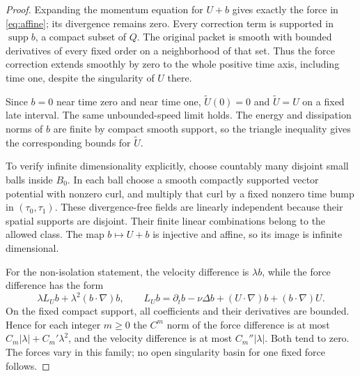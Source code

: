 \documentclass[11pt,a4paper]{article}
\theoremstyle{definition}\newtheorem{definition}[theorem]{Definition}
\theoremstyle{remark}\newtheorem{remark}[theorem]{Remark}
\DeclareMathOperator{\supp}{supp}
\begin{document}
\begin{proof}
Expanding the momentum equation for $U+b$ gives exactly the force in
\eqref{eq:affine}; its divergence remains zero. Every correction term is supported in $\supp b$, a compact subset of $Q$. The original packet is smooth with bounded derivatives of every fixed order on a neighborhood of that set. Thus the force correction extends smoothly by zero to the whole positive time axis, including time one, despite the singularity of $U$ there.

Since $b=0$ near time zero and near time one,
$\widetilde U(0)=0$ and $\widetilde U=U$ on a fixed late interval.
The same unbounded-speed limit holds. The energy and dissipation norms of $b$ are finite by compact smooth support, so the triangle inequality gives the corresponding bounds for $\widetilde U$.

To verify infinite dimensionality explicitly, choose countably many disjoint small balls inside $B_0$. In each ball choose a smooth compactly supported vector potential with nonzero curl, and multiply that curl by a fixed nonzero time bump in $(\tau_0,\tau_1)$. These divergence-free fields are linearly independent because their spatial supports are disjoint. Their finite linear combinations belong to the allowed class. The map $b\mapsto U+b$ is injective and affine, so its image is infinite dimensional.

For the non-isolation statement, the velocity difference is $\lambda b$, while the force difference has the form
\[
 \lambda L_U b+\lambda^2(b\cdot\nabla)b,\qquad
 L_Ub=\partial_tb-\nu\Delta b+(U\cdot\nabla)b+(b\cdot\nabla)U.
\]
On the fixed compact support, all coefficients and their derivatives are bounded. Hence for each integer $m\ge0$ the $C^m$ norm of the force difference is at most $C_m|\lambda|+C_m'\lambda^2$, and the velocity difference is at most $C_m''|\lambda|$. Both tend to zero. The forces vary in this family; no open singularity basin for one fixed force follows.
\end{proof}
\end{document}
